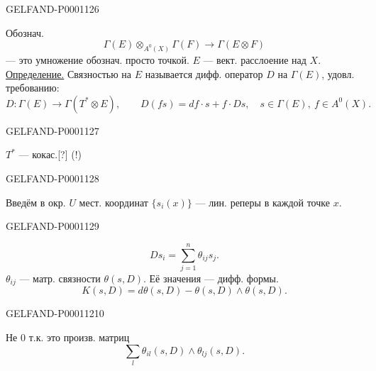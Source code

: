 \begin{GelfandAdjacentEvidence}{GELFAND-P000112}{6}

Обознач.
\begin{equation*}\Gamma(E)\otimes_{A^0(X)}\Gamma(F)\longrightarrow\Gamma(E\otimes F)\end{equation*}
— это умножение обознач. просто точкой.
$E$ — вект. расслоение над $X$.
\underline{Определение.} Связностью на $E$ называется дифф. оператор $D$ на $\Gamma(E)$,
удовл. требованию:
\begin{equation*}
D:\Gamma(E)\longrightarrow\Gamma(T^*\otimes E),\qquad
D(fs)=df\cdot s+f\cdot Ds,\quad s\in\Gamma(E),\ f\in A^0(X).
\end{equation*}
\end{GelfandAdjacentEvidence}
\begin{GelfandAdjacentEvidence}{GELFAND-P000112}{7}

$T^*$ — кокас.[?] (!)
\end{GelfandAdjacentEvidence}
\begin{GelfandAdjacentEvidence}{GELFAND-P000112}{8}

Введём в окр. $U$ мест. координат $\{s_i(x)\}$ — лин. реперы в каждой точке $x$.
\end{GelfandAdjacentEvidence}
\begin{GelfandAdjacentEvidence}{GELFAND-P000112}{9}

\begin{equation*}Ds_i=\sum_{j=1}^n\theta_{ij}s_j.\end{equation*}
$\theta_{ij}$ — матр. связности $\theta(s,D)$.
Её значения — дифф. формы.
\begin{equation*}K(s,D)=d\theta(s,D)-\theta(s,D)\wedge\theta(s,D).\end{equation*}
\end{GelfandAdjacentEvidence}
\begin{GelfandAdjacentEvidence}{GELFAND-P000112}{10}

Не $0$ т.к. это произв. матриц
\begin{equation*}\sum_l\theta_{il}(s,D)\wedge\theta_{lj}(s,D).\end{equation*}
\end{GelfandAdjacentEvidence}
